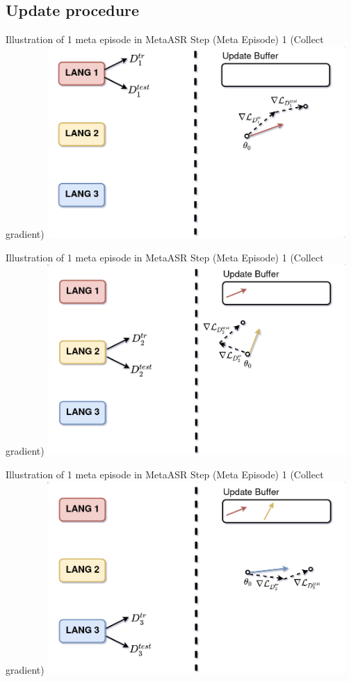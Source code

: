 \documentclass{beamer}
\begin{document}
\subsection{Update procedure}
\begin{frame}[t]{Illustration of 1 meta episode in MetaASR}
  Step (Meta Episode) 1 (Collect gradient)
  \center \includegraphics[width=0.85\textwidth]{fig/meta_step1.png}
\end{frame}

\begin{frame}[t]{Illustration of 1 meta episode in MetaASR}
  Step (Meta Episode) 1 (Collect gradient)
  \center \includegraphics[width=0.85\textwidth]{fig/meta_step2.png}
\end{frame}

\begin{frame}[t]{Illustration of 1 meta episode in MetaASR}
  Step (Meta Episode) 1 (Collect gradient)
  \center \includegraphics[width=0.85\textwidth]{fig/meta_step3.png}
\end{frame}
\end{document}
